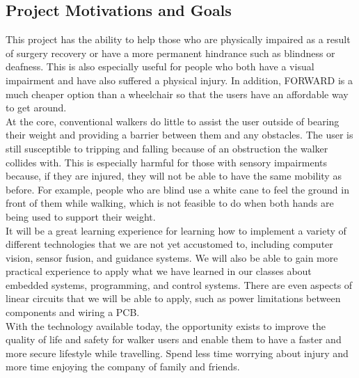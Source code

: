 \subsection{Project Motivations and Goals}
\indent This project has the ability to help those who are physically impaired as a result of surgery recovery or have a more permanent hindrance such as blindness or deafness. This is also especially useful for people who both have a visual impairment and have also suffered a physical injury. In addition, FORWARD is a much cheaper option than a wheelchair so that the users have an affordable way to get around. 
\\

\noindent At the core, conventional walkers do little to assist the user outside of bearing their weight and providing a barrier between them and any obstacles. The user is still susceptible to tripping and falling because of an obstruction the walker collides with. This is especially harmful for those with sensory impairments because, if they are injured, they will not be able to have the same mobility as before. For example, people who are blind use a white cane to feel the ground in front of them while walking, which is not feasible to do when both hands are being used to support their weight. 
\\


\noindent It will be a great learning experience for learning how to implement a variety of different technologies that we are not yet accustomed to, including computer vision, sensor fusion, and guidance systems. We will also be able to gain more practical experience to apply what we have learned in our classes about embedded systems, programming, and control systems. There are even aspects of linear circuits that we will be able to apply, such as power limitations between components and wiring a PCB. 
\\


\noindent With the technology available today, the opportunity exists to improve the quality of life and safety for walker users and enable them to have a faster and more secure lifestyle while travelling. Spend less time worrying about injury and more time enjoying the company of family and friends. \\
